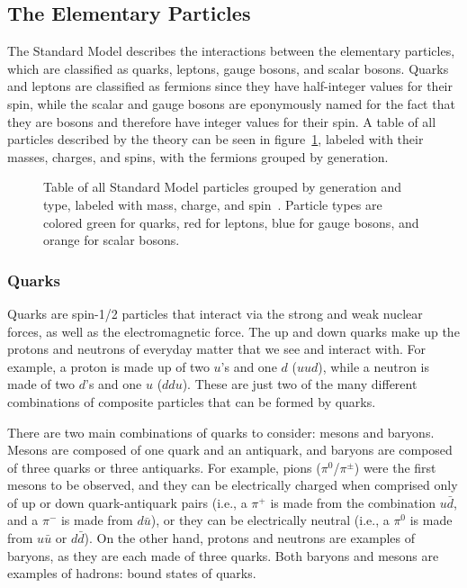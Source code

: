 \subsection{The Elementary Particles}
\label{subsec:particles}

The Standard Model describes the interactions between the elementary particles, which are classified as quarks, leptons, gauge bosons, and scalar bosons.
Quarks and leptons are classified as fermions since they have half-integer values for their spin, while the scalar and gauge bosons are eponymously named for the fact that they are bosons and therefore have integer values for their spin.
A table of all particles described by the theory can be seen in figure~\ref{fig:standardModel}, labeled with their masses, charges, and spins, with the fermions grouped by generation.

\begin{figure}[htbp]
  \centering
  
  \caption[
    Table of all Standard Model particles grouped by generation and type, labeled with mass, charge, and spin.
    Particle types are colored green for quarks, red for leptons, blue for gauge bosons, and orange for scalar bosons.
  ]{
    Table of all Standard Model particles grouped by generation and type, labeled with mass, charge, and spin~\cite{PhysRevD.98.030001}.
    Particle types are colored green for quarks, red for leptons, blue for gauge bosons, and orange for scalar bosons.
  }
  \label{fig:standardModel}
\end{figure}

\subsubsection{Quarks}

Quarks are spin-1/2 particles that interact via the strong and weak nuclear forces, as well as the electromagnetic force.
The up and down quarks make up the protons and neutrons of everyday matter that we see and interact with.
For example, a proton is made up of two $u$'s and one $d$ ($uud$), while a neutron is made of two $d$'s and one $u$ ($ddu$).
These are just two of the many different combinations of composite particles that can be formed by quarks.

There are two main combinations of quarks to consider: mesons and baryons.
Mesons are composed of one quark and an antiquark, and baryons are composed of three quarks or three antiquarks.
For example, pions ($\pi^0$/$\pi^\pm$) were the first mesons to be observed, and they can be electrically charged when comprised only of up or down quark-antiquark pairs (i.e., a $\pi^+$ is made from the combination $u\bar{d}$, and a $\pi^-$ is made from $d\bar{u}$), or they can be electrically neutral (i.e., a $\pi^0$ is made from $u\bar{u}$ or $d\bar{d}$).
On the other hand, protons and neutrons are examples of baryons, as they are each made of three quarks.
Both baryons and mesons are examples of hadrons: bound states of quarks.

